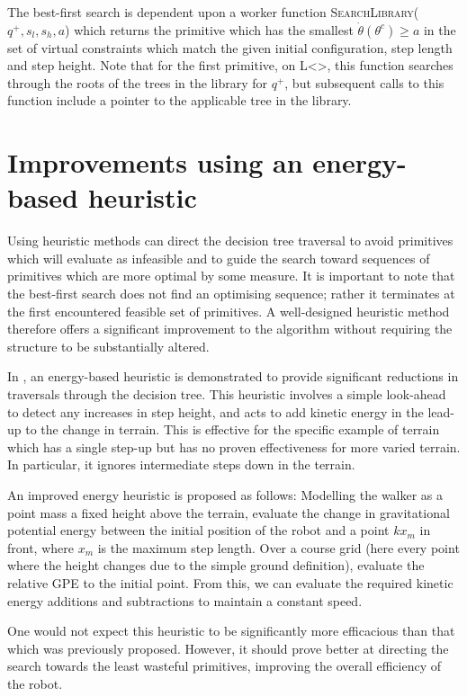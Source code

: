The best-first search is dependent upon a worker function \textsc{SearchLibrary}($q^+,s_l,s_h,a$) which returns the primitive which has the smallest $\dot{\theta}(\theta^c) \geq a$ in the set of virtual constraints which match the given initial configuration, step length and step height. Note that for the first primitive, on {\color{blue} L<>}, this function searches through the roots of the trees in the library for $q^+$, but subsequent calls to this function include a pointer to the applicable tree in the library.

\section[Energy-based heuristic]{Improvements using an energy-based heuristic}
Using heuristic methods can direct the decision tree traversal to avoid primitives which will evaluate as infeasible and to guide the search toward sequences of primitives which are more optimal by some measure. It is important to note that the best-first search does not find an optimising sequence; rather it terminates at the first encountered feasible set of primitives. A well-designed heuristic method therefore offers a significant improvement to the algorithm without requiring the structure to be substantially altered.

In \cite{manchester13planning}, an energy-based heuristic is demonstrated to provide significant reductions in traversals through the decision tree. This heuristic involves a simple look-ahead to detect any increases in step height, and acts to add kinetic energy in the lead-up to the change in terrain. This is effective for the specific example of terrain which has a single step-up but has no proven effectiveness for more varied terrain. In particular, it ignores intermediate steps down in the terrain.

{\color{blue}An improved energy heuristic is proposed as follows: Modelling the walker as a point mass a fixed height above the terrain, evaluate the change in gravitational potential energy between the initial position of the robot and a point $kx_m$ in front, where $x_m$ is the maximum step length. Over a course grid (here every point where the height changes due to the simple ground definition), evaluate the relative GPE to the initial point. From this, we can evaluate the required kinetic energy additions and subtractions to maintain a constant speed.
	
One would not expect this heuristic to be significantly more efficacious than that which was previously proposed. However, it should prove better at directing the search towards the least wasteful primitives, improving the overall efficiency of the robot.}